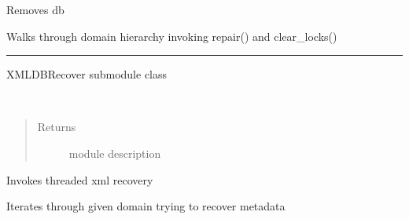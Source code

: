 \documentclass[letterpaper,10pt,english]{sphinxmanual}
\begin{document}

\begin{fulllineitems}
\label{recover:dbrecover.recover.remove}
Removes db

\end{fulllineitems}


\begin{fulllineitems}
\label{recover:dbrecover.repair.repair}
Walks through domain hierarchy invoking repair() and clear\_locks()

\end{fulllineitems}



\bigskip\hrule{}\bigskip


\begin{fulllineitems}
\label{recover:dbrecover.xml_recover.XMLDBRecover}
XMLDBRecover submodule class

\begin{fulllineitems}
\label{recover:dbrecover.xml_recover.XMLDBRecover.description}~\begin{quote}\begin{description}
\item[{Returns}] \leavevmode
module description

\end{description}\end{quote}

\end{fulllineitems}


\begin{fulllineitems}
\label{recover:dbrecover.xml_recover.XMLDBRecover.load}
Invokes threaded xml recovery

\end{fulllineitems}


\begin{fulllineitems}
\label{recover:dbrecover.xml_recover.XMLDBRecover.recover_domain}
Iterates through given domain trying to recover metadata

\end{fulllineitems}


\end{fulllineitems}
\end{document}
